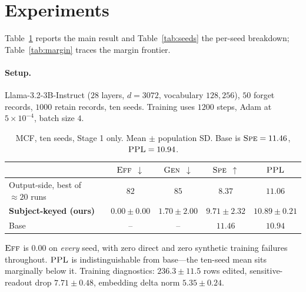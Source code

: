 \documentclass[11pt]{article}
\newcommand{\Eff}{\textsc{Eff}}
\newcommand{\Gen}{\textsc{Gen}}
\newcommand{\Spe}{\textsc{Spe}}
\newcommand{\PPL}{\textsc{PPL}}
\newcommand{\down}{$\downarrow$}
\newcommand{\up}{$\uparrow$}
\begin{document}
\section{Experiments}

Table~\ref{tab:main} reports the main result and Table~\ref{tab:seeds} the
per-seed breakdown; Table~\ref{tab:margin} traces the margin frontier.

\paragraph{Setup.} Llama-3.2-3B-Instruct ($28$ layers, $d = 3072$, vocabulary
$128{,}256$), $50$ forget records, $1000$ retain records, ten seeds. Training
uses $1200$ steps, Adam at $5\times10^{-4}$, batch size $4$.

\begin{table}[h]
\centering
\caption{MCF, ten seeds, Stage 1 only. Mean $\pm$ population SD. Base is
$\Spe = 11.46$, $\PPL = 10.94$.}
\label{tab:main}
\begin{tabular}{lcccc}
\toprule
& $\Eff$ \down & $\Gen$ \down & $\Spe$ \up & $\PPL$ \\
\midrule
Output-side, best of $\approx 20$ runs & $82$ & $85$ & $8.37$ & $11.06$ \\
\textbf{Subject-keyed (ours)}
  & $\mathbf{0.00 \pm 0.00}$
  & $\mathbf{1.70 \pm 2.00}$
  & $9.71 \pm 2.32$
  & $\mathbf{10.89 \pm 0.21}$ \\
\midrule
Base & -- & -- & $11.46$ & $10.94$ \\
\bottomrule
\end{tabular}
\end{table}

\noindent
$\Eff$ is $0.00$ on \emph{every} seed, with zero direct and zero synthetic
training failures throughout. $\PPL$ is indistinguishable from base---the
ten-seed mean sits marginally below it. Training diagnostics:
$236.3 \pm 11.5$ rows edited, sensitive-readout drop $7.71 \pm 0.48$, embedding
delta norm $5.35 \pm 0.24$.
\end{document}
